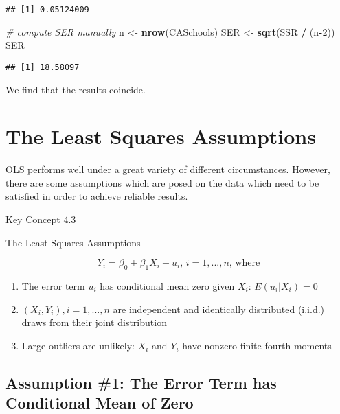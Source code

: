 \documentclass[]{book}
\newenvironment{Shaded}{\begin{snugshade}}{\end{snugshade}}
\newcommand{\KeywordTok}[1]{\textcolor[rgb]{0.13,0.29,0.53}{\textbf{#1}}}
\newcommand{\DecValTok}[1]{\textcolor[rgb]{0.00,0.00,0.81}{#1}}
\newcommand{\StringTok}[1]{\textcolor[rgb]{0.31,0.60,0.02}{#1}}
\newcommand{\CommentTok}[1]{\textcolor[rgb]{0.56,0.35,0.01}{\textit{#1}}}
\newcommand{\OperatorTok}[1]{\textcolor[rgb]{0.81,0.36,0.00}{\textbf{#1}}}
\newcommand{\NormalTok}[1]{#1}
\providecommand{\tightlist}{%
  \setlength{\itemsep}{0pt}\setlength{\parskip}{0pt}}
\theoremstyle{definition}
\theoremstyle{definition}
\theoremstyle{definition}
\theoremstyle{remark}
\begin{document}
\begin{verbatim}
## [1] 0.05124009
\end{verbatim}

\begin{Shaded}
\begin{Highlighting}[]
\CommentTok{# compute SER manually}
\NormalTok{n <-}\StringTok{ }\KeywordTok{nrow}\NormalTok{(CASchools)}
\NormalTok{SER <-}\StringTok{ }\KeywordTok{sqrt}\NormalTok{(SSR }\OperatorTok{/}\StringTok{ }\NormalTok{(n}\OperatorTok{-}\DecValTok{2}\NormalTok{))}
\NormalTok{SER}
\end{Highlighting}
\end{Shaded}

\begin{verbatim}
## [1] 18.58097
\end{verbatim}

We find that the results coincide.

\section{The Least Squares
Assumptions}\label{the-least-squares-assumptions}

OLS performs well under a great variety of different circumstances.
However, there are some assumptions which are posed on the data which
need to be satisfied in order to achieve reliable results.

Key Concept 4.3

The Least Squares Assumptions

\[Y_i = \beta_0 + \beta_1 X_i + u_i \text{, } i = 1, ...,n \text{, where} \]

\begin{enumerate}
\def\labelenumi{\arabic{enumi}.}
\tightlist
\item
  The error term \(u_i\) has conditional mean zero given \(X_i\):
  \(E(u_i|X_i) = 0\)
\item
  \((X_i,Y_i), i = 1,...,n\) are independent and identically distributed
  (i.i.d.) draws from their joint distribution
\item
  Large outliers are unlikely: \(X_i\) and \(Y_i\) have nonzero finite
  fourth moments
\end{enumerate}

\subsection{Assumption \#1: The Error Term has Conditional Mean of
Zero}\label{assumption-1-the-error-term-has-conditional-mean-of-zero}
\end{document}
